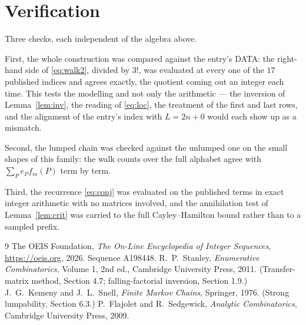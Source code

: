 \documentclass[11pt,a4paper]{article}
\theoremstyle{plain}
\theoremstyle{definition}
\begin{document}
\section{Verification}

Three checks, each independent of the algebra above.

First, the whole construction was compared against the entry's DATA: the right-hand side of
\eqref{eq:walk2}, divided by $3!$, was evaluated at every one of the $17$
published indices and agrees exactly, the quotient coming out an integer each time. This
tests the modelling and not only the arithmetic --- the inversion of Lemma~\ref{lem:inv},
the reading of \eqref{eq:loc}, the treatment of the first and last rows, and the
alignment of the entry's index with $L=2n+0$ would each show up as a mismatch.

Second, the lumped chain was checked against the unlumped one on the small shapes of this
family: the walk counts over the full alphabet agree with $\sum_P e_Pf_m(P)$ term by term.

Third, the recurrence \eqref{eq:conj} was evaluated on the published terms in exact integer
arithmetic with no matrices involved, and the annihilation test of Lemma~\ref{lem:crit} was
carried to the full Cayley--Hamilton bound rather than to a sampled prefix.

\begin{thebibliography}{9}
 The OEIS Foundation, \emph{The On-Line Encyclopedia of Integer
Sequences}, \url{https://oeis.org}, 2026. Sequence A198448.
 R.~P.~Stanley, \emph{Enumerative Combinatorics}, Volume 1, 2nd ed.,
Cambridge University Press, 2011. (Transfer-matrix method, Section 4.7; falling-factorial
inversion, Section 1.9.)
 J.~G.~Kemeny and J.~L.~Snell, \emph{Finite Markov Chains}, Springer,
1976. (Strong lumpability, Section 6.3.)
 P.~Flajolet and R.~Sedgewick, \emph{Analytic Combinatorics}, Cambridge
University Press, 2009.
\end{thebibliography}
\end{document}
